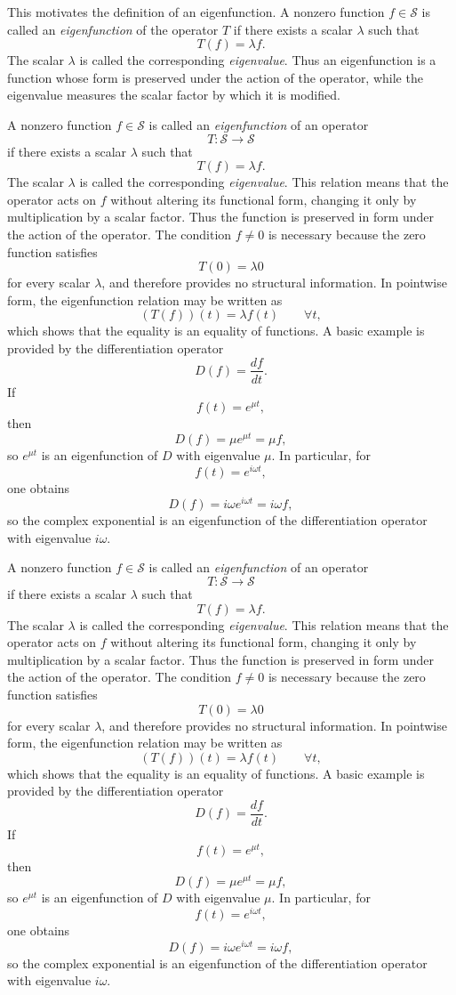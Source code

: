 \documentclass{article}
\begin{document}
	This motivates the definition of an eigenfunction. A nonzero function \(f\in\mathcal{S}\) is called an \emph{eigenfunction} of the operator \(T\) if there exists a scalar \(\lambda\) such that
	\[
	T(f)=\lambda f.
	\]
	The scalar \(\lambda\) is called the corresponding \emph{eigenvalue}. Thus an eigenfunction is a function whose form is preserved under the action of the operator, while the eigenvalue measures the scalar factor by which it is modified.
	
	A nonzero function \(f\in\mathcal{S}\) is called an \emph{eigenfunction} of an operator
	\[
	T:\mathcal{S}\to\mathcal{S}
	\]
	if there exists a scalar \(\lambda\) such that
	\[
	T(f)=\lambda f.
	\]
	The scalar \(\lambda\) is called the corresponding \emph{eigenvalue}. This relation means that the operator acts on \(f\) without altering its functional form, changing it only by multiplication by a scalar factor. Thus the function is preserved in form under the action of the operator. The condition \(f\neq 0\) is necessary because the zero function satisfies
	\[
	T(0)=\lambda 0
	\]
	for every scalar \(\lambda\), and therefore provides no structural information. In pointwise form, the eigenfunction relation may be written as
	\[
	(T(f))(t)=\lambda f(t)\qquad \forall t,
	\]
	which shows that the equality is an equality of functions. A basic example is provided by the differentiation operator
	\[
	D(f)=\frac{df}{dt}.
	\]
	If
	\[
	f(t)=e^{\mu t},
	\]
	then
	\[
	D(f)=\mu e^{\mu t}=\mu f,
	\]
	so \(e^{\mu t}\) is an eigenfunction of \(D\) with eigenvalue \(\mu\). In particular, for
	\[
	f(t)=e^{i\omega t},
	\]
	one obtains
	\[
	D(f)=i\omega e^{i\omega t}=i\omega f,
	\]
	so the complex exponential is an eigenfunction of the differentiation operator with eigenvalue \(i\omega\).
	
	A nonzero function \(f\in\mathcal{S}\) is called an \emph{eigenfunction} of an operator
	\[
	T:\mathcal{S}\to\mathcal{S}
	\]
	if there exists a scalar \(\lambda\) such that
	\[
	T(f)=\lambda f.
	\]
	The scalar \(\lambda\) is called the corresponding \emph{eigenvalue}. This relation means that the operator acts on \(f\) without altering its functional form, changing it only by multiplication by a scalar factor. Thus the function is preserved in form under the action of the operator. The condition \(f\neq 0\) is necessary because the zero function satisfies
	\[
	T(0)=\lambda 0
	\]
	for every scalar \(\lambda\), and therefore provides no structural information. In pointwise form, the eigenfunction relation may be written as
	\[
	(T(f))(t)=\lambda f(t)\qquad \forall t,
	\]
	which shows that the equality is an equality of functions. A basic example is provided by the differentiation operator
	\[
	D(f)=\frac{df}{dt}.
	\]
	If
	\[
	f(t)=e^{\mu t},
	\]
	then
	\[
	D(f)=\mu e^{\mu t}=\mu f,
	\]
	so \(e^{\mu t}\) is an eigenfunction of \(D\) with eigenvalue \(\mu\). In particular, for
	\[
	f(t)=e^{i\omega t},
	\]
	one obtains
	\[
	D(f)=i\omega e^{i\omega t}=i\omega f,
	\]
	so the complex exponential is an eigenfunction of the differentiation operator with eigenvalue \(i\omega\).
	
\end{document}
